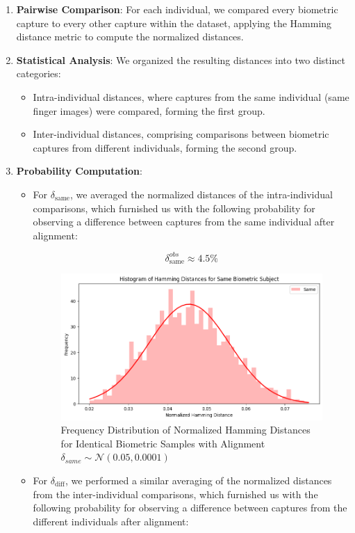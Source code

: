 \begin{enumerate}
    \item \textbf{Pairwise Comparison}: For each individual, we compared every biometric capture to every other capture within the dataset, applying the Hamming distance metric to compute the normalized distances.
    \item \textbf{Statistical Analysis}: We organized the resulting distances into two distinct categories:
    \begin{itemize}
        \item Intra-individual distances, where captures from the same individual (same finger images) were compared, forming the first group.
        \item Inter-individual distances, comprising comparisons between biometric captures from different individuals, forming the second group.
    \end{itemize}
    \newpage
    \item \textbf{Probability Computation}:
    \begin{itemize}
        \item For \( \delta_{\text{same}} \), we averaged the normalized distances of the intra-individual comparisons, which furnished us with the following probability for observing a difference between captures from the same individual after alignment:

        \[ \delta_{\text{same}}^{obs} \approx 4.5\% \]

        \begin{figure}[H]
            \centering
            \includegraphics[width=0.7\linewidth]{latex-img/delta_same.png}
            \caption{Frequency Distribution of Normalized Hamming Distances for Identical Biometric Samples with Alignment \(\delta_{same} \sim \mathcal{N}(0.05, 0.0001)\)}
            \label{delta_same}
        \end{figure}
        
        \item For \( \delta_{\text{diff}} \), we performed a similar averaging of the normalized distances from the inter-individual comparisons, which furnished us with the following probability for observing a difference between captures from the different individuals after alignment:


\end{itemize}
\end{enumerate}
